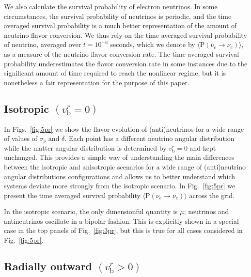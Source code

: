 \documentclass[aps, prd, 10pt, twocolumn, superscriptaddress, noshowpacs, preprintnumbers, longbibliography, groupedaddress, footinbib, bibnotes]{revtex4-1}
\newcommand{\vbr}{v_{\mathrm{b}}^{r}}
\begin{document}
We also calculate the survival probability of electron neutrinos. In some circumstances, the survival probability of neutrinos is periodic, and the time averaged survival probability is a much better representation of the amount of neutrino flavor conversion. We thus rely on the time averaged survival probability of neutrino, averaged over $t=10^{-6}$ seconds, which we denote by $\langle \textrm{P} (\nu_{e} \rightarrow \nu_{e}) \rangle $,
as a measure of the neutrino flavor conversion rate. The time averaged survival probability underestimates the flavor conversion rate in some instances due to the significant amount of time required to reach the nonlinear regime, but it is nonetheless a fair representation for the purpose of this paper.






\subsection{Isotropic $(\vbr=0)$}
 
In Figs.~\ref{fig:5pr} we show the flavor evolution of (anti)neutrinos for a wide range of values of $\sigma_{\nu}$ and $\delta$. Each point has a different neutrino angular distribution while the matter angular distribution is determined by $\vbr=0$ and kept unchanged. This provides a simple way of understanding the main differences between the isotropic and anisotropic scenarios for a wide range of (anti)neutrino angular distributions configurations and allows us to better understand which systems deviate more strongly from the isotropic scenario. In Fig.~\ref{fig:5pr} we present the time averaged survival probability $\langle \mathrm{P}(\nu_{e}\rightarrow \nu_{e}) \rangle$ across the grid. 

In the isotropic scenario, the only dimensionful quantity is $\mu$; neutrinos and antineutrinos oscillate in a bipolar fashion. This is explicitly shown in a special case in the top panels of Fig.~\ref{fig:3pr}, but this is true for all cases considered in Fig.~\ref{fig:5pr}.




	
\subsection{Radially outward $(\vbr > 0)$}
\end{document}
